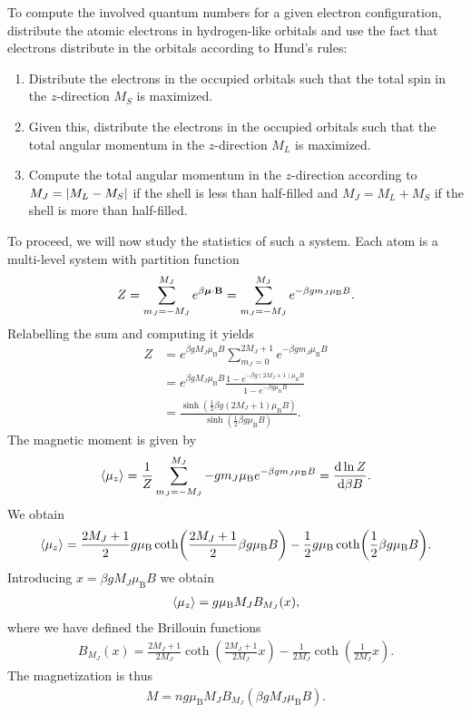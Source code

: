 To compute the involved quantum numbers for a given electron configuration, distribute the atomic electrons in hydrogen-like orbitals and use the fact that electrons distribute in the orbitals according to Hund's rules:
\begin{enumerate}
	\item Distribute the electrons in the occupied orbitals such that the total spin in the $z$-direction $M_{S}$ is maximized.
	\item Given this, distribute the electrons in the occupied orbitals such that the total angular momentum in the $z$-direction $M_{L}$ is maximized.
	\item Compute the total angular momentum in the $z$-direction according to $M_{J} = \abs{M_{L} - M_{S}}$ if the shell is less than half-filled and $M_{J} = M_{L} + M_{S}$ if the shell is more than half-filled.
\end{enumerate}

To proceed, we will now study the statistics of such a system. Each atom is a multi-level system with partition function
\begin{align*}
	Z = \sum\limits_{m_{J} = -M_{J}}^{M_{J}}e^{\beta\vb*{\mu}\cdot\vb{B}} = \sum\limits_{m_{J} = -M_{J}}^{M_{J}}e^{-\beta gm_{J}\mu_{\text{B}}B}.
\end{align*}
Relabelling the sum and computing it yields
\begin{align*}
	Z &= e^{\beta gM_{J}\mu_{\text{B}}B}\sum\limits_{m_{J} = 0}^{2M_{J} + 1}e^{-\beta gm_{J}\mu_{\text{B}}B} \\
	  &= e^{\beta gM_{J}\mu_{\text{B}}B}\frac{1 - e^{-\beta g(2M_{J} + 1)\mu_{\text{B}}B}}{1 - e^{-\beta g\mu_{\text{B}}B}} \\
	  &= \frac{\sinh(\frac{1}{2}\beta g(2M_{J} + 1)\mu_{\text{B}}B)}{\sinh(\frac{1}{2}\beta g\mu_{\text{B}}B)}.
\end{align*}
The magnetic moment is given by
\begin{align*}
	\expval{\mu_{z}} = \frac{1}{Z}\sum\limits_{m_{J} = -M_{J}}^{M_{J}}-gm_{J}\mu_{\text{B}}e^{-\beta gm_{J}\mu_{\text{B}}B} = \dv{\ln{Z}}{\beta B}.
\end{align*}
We obtain
\begin{align*}
	\expval{\mu_{z}} = \frac{2M_{J} + 1}{2}g\mu_{\text{B}}\coth(\frac{2M_{J} + 1}{2}\beta g\mu_{\text{B}}B) - \frac{1}{2}g\mu_{\text{B}}\coth(\frac{1}{2}\beta g\mu_{\text{B}}B).
\end{align*}
Introducing $x = \beta gM_{J}\mu_{\text{B}}B$ we obtain
\begin{align*}
	\expval{\mu_{z}} = g\mu_{\text{B}}M_{J}B_{M_{J}}(x),
\end{align*}
where we have defined the Brillouin functions
\begin{align*}
	B_{M_{J}}(x) = \frac{2M_{J} + 1}{2M_{J}}\coth(\frac{2M_{J} + 1}{2M_{J}}x) - \frac{1}{2M_{J}}\coth(\frac{1}{2M_{J}}x).
\end{align*}
The magnetization is thus
\begin{align*}
	M = ng\mu_{\text{B}}M_{J}B_{M_{J}}\left(\beta gM_{J}\mu_{\text{B}}B\right).
\end{align*}

